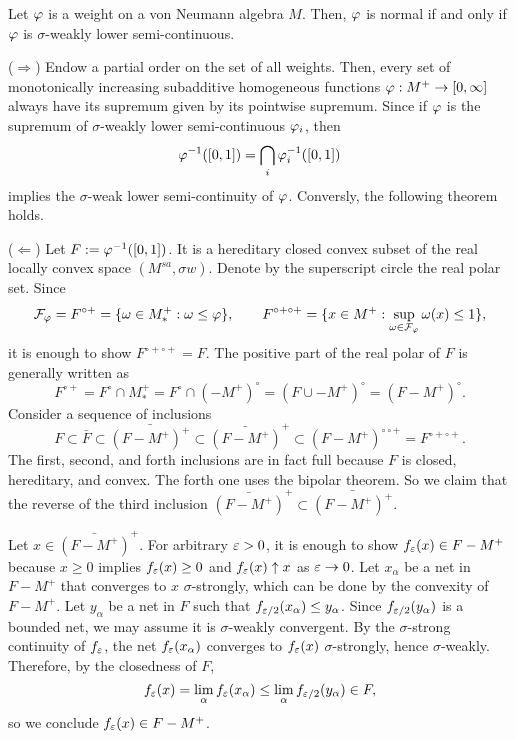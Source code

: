 \documentclass{../../small}
\begin{document}
\begin{thm}
Let $\varphi$ is a weight on a von Neumann algebra $M$.
Then, $\varphi$ is normal if and only if $\varphi$ is $\sigma$-weakly lower semi-continuous.
\end{thm}
\begin{pf}
($\Rightarrow$)
Endow a partial order on the set of all weights.
Then, every set of monotonically increasing subadditive homogeneous functions $\varphi:M^+\to[0,\infty]$ always have its supremum given by its pointwise supremum.
Since if $\varphi$ is the supremum of $\sigma$-weakly lower semi-continuous $\varphi_i$, then
\[\varphi^{-1}([0,1])=\bigcap_i\varphi_i^{-1}([0,1])\]
implies the $\sigma$-weak lower semi-continuity of $\varphi$.
Conversly, the following theorem holds.

($\Leftarrow$)
Let $F:=\varphi^{-1}([0,1])$.
It is a hereditary closed convex subset of the real locally convex space $(M^{sa},\sigma w)$.
Denote by the superscript circle the real polar set.
Since
\[\mathcal{F}_\varphi=F^{\circ+}=\{\omega\in M_*^+:\omega\le\varphi\},\qquad
F^{\circ+\circ+}=\{x\in M^+:\sup_{\omega\in\mathcal{F}_\varphi}\omega(x)\le1\},\]
it is enough to show $F^{\circ+\circ+}=F$.
The positive part of the real polar of $F$ is generally written as
\[F^{\circ+}=F^\circ\cap M_*^+=F^\circ\cap(-M^+)^\circ=(F\cup-M^+)^\circ=(F-M^+)^\circ.\]
Consider a sequence of inclusions
\[F\subset\bar F\subset\bar{(F-M^+)^+}\subset\bar{(F-M^+)}^+\subset(F-M^+)^{\circ\circ+}=F^{\circ+\circ+}.\]
The first, second, and forth inclusions are in fact full because $F$ is closed, hereditary, and convex.
The forth one uses the bipolar theorem.
So we claim that the reverse of the third inclusion $\bar{(F-M^+)}^+\subset\bar{(F-M^+)^+}$.

Let $x\in\bar{(F-M^+)}^+$.
For arbitrary $\varepsilon>0$, it is enough to show $f_\varepsilon(x)\in F-M^+$ because $x\ge0$ implies $f_\varepsilon(x)\ge0$ and $f_\varepsilon(x)\uparrow x$ as $\varepsilon\to0$.
Let $x_\alpha$ be a net in $F-M^+$ that converges to $x$ $\sigma$-strongly, which can be done by the convexity of $F-M^+$.
Let $y_\alpha$ be a net in $F$ such that $f_{\varepsilon/2}(x_\alpha)\le y_\alpha$.
Since $f_{\varepsilon/2}(y_\alpha)$ is a bounded net, we may assume it is $\sigma$-weakly convergent.
By the $\sigma$-strong continuity of $f_\varepsilon$, the net $f_\varepsilon(x_\alpha)$ converges to $f_\varepsilon(x)$ $\sigma$-strongly, hence $\sigma$-weakly.
Therefore, by the closedness of $F$,
\[f_\varepsilon(x)=\lim_\alpha f_\varepsilon(x_\alpha)\le\lim_\alpha f_{\varepsilon/2}(y_\alpha)\in F,\]
so we conclude $f_\varepsilon(x)\in F-M^+$.
\end{pf}
\end{document}
